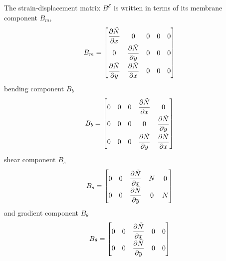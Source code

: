 \documentclass[12pt]{article}
\numberwithin{equation}{section}
\newcommand{\dpdiff}[2]{ \dfrac{\partial #1}{ \partial #2} }
\def\el{{ \mathcal{E} }}
\begin{document}
The strain-displacement matrix \( B^\el \) is written in terms of its membrane component \( B_m \),
%
\begin{equation}
    {\renewcommand\arraystretch{2.0}
        B_m =
        \begin{bmatrix}
            \dpdiff{\tilde{N}}{x} & 0                     & 0 & 0 & 0 \\
            0                     & \dpdiff{\tilde{N}}{y} & 0 & 0 & 0 \\
            \dpdiff{\tilde{N}}{y} & \dpdiff{\tilde{N}}{x} & 0 & 0 & 0 \\
        \end{bmatrix}
    }
\end{equation}
%
bending component \(B_b\)
% 
\begin{equation}
    {\renewcommand\arraystretch{2.0}
        B_b =
        \begin{bmatrix}
            0 & 0 & 0 & \dpdiff{\tilde{N}}{x} & 0                     \\
            0 & 0 & 0 & 0                     & \dpdiff{\tilde{N}}{y} \\
            0 & 0 & 0 & \dpdiff{\tilde{N}}{y} & \dpdiff{\tilde{N}}{x}
        \end{bmatrix}
    }
\end{equation}
% 
shear component \(B_s\)
% 
\begin{equation}
    {\renewcommand\arraystretch{2.0}
        B_s =
        \begin{bmatrix}
            0 & 0 & \dpdiff{\tilde{N}}{x} & N & 0 \\
            0 & 0 & \dpdiff{\tilde{N}}{y} & 0 & N \\
        \end{bmatrix}
    }
\end{equation}
%
and gradient component \(B_\theta\)
% 
\begin{equation}
    {\renewcommand\arraystretch{2.0}
        B_\theta =
        \begin{bmatrix}
            0 & 0 & \dpdiff{\tilde{N}}{x} & 0 & 0 \\
            0 & 0 & \dpdiff{\tilde{N}}{y} & 0 & 0 \\
        \end{bmatrix}
    }
\end{equation}
%
\end{document}
